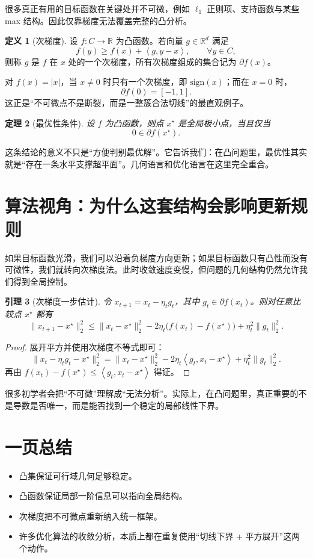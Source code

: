 \documentclass[11pt]{article}
\numberwithin{equation}{section}
\theoremstyle{plain}
\newtheorem{theorem}{定理}[section]
\newtheorem{lemma}[theorem]{引理}
\theoremstyle{definition}
\newtheorem{definition}[theorem]{定义}
\theoremstyle{remark}
\newcommand{\R}{\mathbb{R}}
\newcommand{\ip}[2]{\left\langle #1, #2 \right\rangle}
\begin{document}
很多真正有用的目标函数在关键处并不可微，例如 $\ell_1$ 正则项、支持函数与某些 max 结构。因此仅靠梯度无法覆盖完整的凸分析。

\begin{definition}[次梯度]
设 $f:C\to \R$ 为凸函数。若向量 $g\in \R^d$ 满足
\[
f(y)\ge f(x)+\ip{g}{y-x}, \qquad \forall y\in C,
\]
则称 $g$ 是 $f$ 在 $x$ 处的一个次梯度，所有次梯度组成的集合记为 $\partial f(x)$。
\end{definition}

\begin{ExampleBox}
对 $f(x)=|x|$，当 $x\neq 0$ 时只有一个次梯度，即 $\mathrm{sign}(x)$；而在 $x=0$ 时，
\[
\partial f(0)=[-1,1].
\]
这正是“不可微点不是断裂，而是一整簇合法切线”的最直观例子。
\end{ExampleBox}

\begin{theorem}[最优性条件]
设 $f$ 为凸函数，则点 $x^\star$ 是全局极小点，当且仅当
\[
0\in \partial f(x^\star).
\]
\end{theorem}

\begin{AnalysisBox}
这条结论的意义不只是“方便判别最优解”。它告诉我们：在凸问题里，最优性其实就是“存在一条水平支撑超平面”。几何语言和优化语言在这里完全重合。
\end{AnalysisBox}

\section{算法视角：为什么这套结构会影响更新规则}

如果目标函数光滑，我们可以沿着负梯度方向更新；如果目标函数只有凸性而没有可微性，我们就转向次梯度法。此时收敛速度变慢，但问题的几何结构仍然允许我们得到全局控制。

\begin{lemma}[次梯度一步估计]
令 $x_{t+1}=x_t-\eta_t g_t$，其中 $g_t\in \partial f(x_t)$。则对任意比较点 $x^\star$ 都有
\[
\|x_{t+1}-x^\star\|_2^2
\le
\|x_t-x^\star\|_2^2
-2\eta_t\bigl(f(x_t)-f(x^\star)\bigr)
+\eta_t^2\|g_t\|_2^2.
\]
\end{lemma}

\begin{proof}
展开平方并使用次梯度不等式即可：
\[
\|x_t-\eta_t g_t-x^\star\|_2^2
= \|x_t-x^\star\|_2^2 - 2\eta_t\ip{g_t}{x_t-x^\star} + \eta_t^2\|g_t\|_2^2.
\]
再由 $f(x_t)-f(x^\star)\le \ip{g_t}{x_t-x^\star}$ 得证。
\end{proof}

\begin{RemarkBox}
很多初学者会把“不可微”理解成“无法分析”。实际上，在凸问题里，真正重要的不是导数是否唯一，而是能否找到一个稳定的局部线性下界。
\end{RemarkBox}

\section{一页总结}

\begin{itemize}
  \item 凸集保证可行域几何足够稳定。
  \item 凸函数保证局部一阶信息可以指向全局结构。
  \item 次梯度把不可微点重新纳入统一框架。
  \item 许多优化算法的收敛分析，本质上都在重复使用“切线下界 + 平方展开”这两个动作。
\end{itemize}
\end{document}
